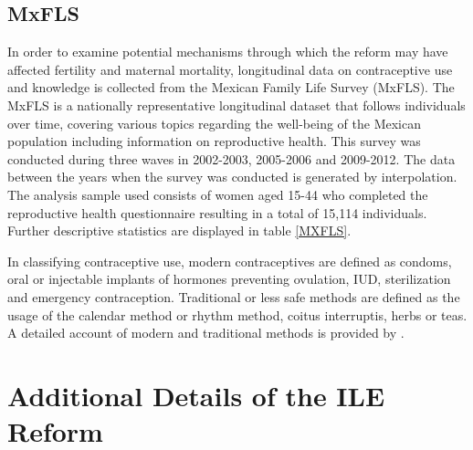 \documentclass[a4paper, 11pt]{article}
\begin{document}
\begin{spacing}{1.4}
\subsection{MxFLS}\label{mxfls} 
In order to examine potential mechanisms through which the reform may have affected
fertility and maternal mortality, longitudinal data on contraceptive use and knowledge
is collected from the Mexican Family Life Survey (MxFLS). The MxFLS is a nationally
representative longitudinal dataset that follows individuals over time, covering various
topics regarding the well-being of the Mexican population including information on
reproductive health. This survey was conducted during three waves in 2002-2003, 2005-2006
and 2009-2012. The data between the years when the survey was conducted is generated by
interpolation. The analysis sample used consists of women aged 15-44 who completed the
reproductive health questionnaire resulting in a total of 15,114 individuals.
Further descriptive statistics are displayed in table \ref{MXFLS}.

In classifying contraceptive use, modern contraceptives are defined as condoms, oral
or injectable implants of hormones preventing ovulation, IUD, sterilization and
emergency contraception. Traditional or less safe methods are defined as the usage of
the calendar method or rhythm method, coitus interruptis, herbs or teas. A detailed
account of modern and traditional methods is provided by \citet{WHO2015b}.
 
 
\section{Additional Details of the ILE Reform}

\end{spacing}
\end{document}
